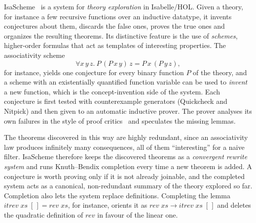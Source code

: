 \documentclass[preprint,12pt]{elsarticle}
\newcommand{\rw}{\to}
\begin{document}
IsaScheme~\cite{MontanoRivas12} is a system for \emph{theory exploration}
in Isabelle/HOL. Given a theory, for instance a few recursive functions
over an inductive datatype, it invents conjectures about them, discards the
false ones, proves the true ones and organizes the resulting theorems. Its
distinctive feature is the use of \emph{schemes}, higher-order formulas
that act as templates of interesting properties. The associativity scheme
\[
  \forall x\,y\,z.\ P\,(P\,x\,y)\,z = P\,x\,(P\,y\,z),
\]
for instance, yields one conjecture for every binary function $P$ of the
theory, and a scheme with an existentially quantified function variable
can be used to \emph{invent} a new function, which is the
concept-invention side of the system. Each conjecture is first tested with
counterexample generators (Quickcheck and Nitpick) and then given to an
automatic inductive prover. The prover analyses its own failures in the
style of proof critics~\cite{IrelandBundy96,Walsh96} and speculates the
missing lemmas.

The theorems discovered in this way are highly redundant, since an
associativity law produces infinitely many consequences, all of them
``interesting'' for a naive filter. IsaScheme therefore keeps the
discovered theorems as a \emph{convergent rewrite system} and runs
Knuth--Bendix completion every time a new theorem is added. A conjecture
is worth proving only if it is not already joinable, and the completed
system acts as a canonical, non-redundant summary of the theory explored so
far. Completion also lets the system replace definitions. Completing the
lemma $\mathit{itrev}\;xs\;[\,] = \mathit{rev}\;xs$, for instance, orients
it as $\mathit{rev}\;xs \rw \mathit{itrev}\;xs\;[\,]$ and deletes the
quadratic definition of $\mathit{rev}$ in favour of the linear one.
\end{document}
